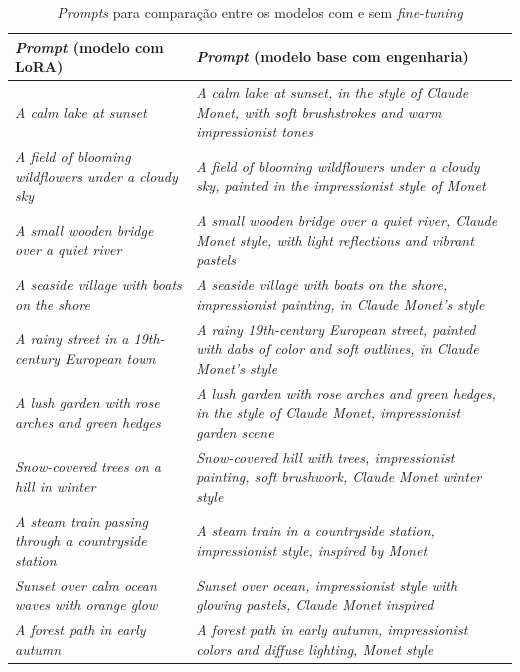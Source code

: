 \begin{table}[htb]
\caption{\textit{Prompts} para compara\c{c}\~ao entre os modelos com e sem \textit{fine-tuning}}
\centering
\begin{tabular}{p{} p{}}
\toprule
\textbf{\textit{Prompt} (modelo com LoRA)} & \textbf{\textit{Prompt} (modelo base com engenharia)} \\
\midrule
\textit{A calm lake at sunset} &
\textit{A calm lake at sunset, in the style of Claude Monet, with soft brushstrokes and warm impressionist tones} \\
\textit{A field of blooming wildflowers under a cloudy sky} &
\textit{A field of blooming wildflowers under a cloudy sky, painted in the impressionist style of Monet} \\
\textit{A small wooden bridge over a quiet river} &
\textit{A small wooden bridge over a quiet river, Claude Monet style, with light reflections and vibrant pastels }\\
\textit{A seaside village with boats on the shore }&
\textit{A seaside village with boats on the shore, impressionist painting, in Claude Monet's style }\\
\textit{A rainy street in a 19th-century European town} &
\textit{A rainy 19th-century European street, painted with dabs of color and soft outlines, in Claude Monet’s style} \\
\textit{A lush garden with rose arches and green hedges} &
\textit{A lush garden with rose arches and green hedges, in the style of Claude Monet, impressionist garden scene} \\
\textit{Snow-covered trees on a hill in winter }&
\textit{Snow-covered hill with trees, impressionist painting, soft brushwork, Claude Monet winter style} \\
\textit{A steam train passing through a countryside station} &
\textit{A steam train in a countryside station, impressionist style, inspired by Monet }\\
\textit{Sunset over calm ocean waves with orange glow }&
\textit{Sunset over ocean, impressionist style with glowing pastels, Claude Monet inspired }\\
\textit{A forest path in early autumn} &
\textit{A forest path in early autumn, impressionist colors and diffuse lighting, Monet style} \\
\bottomrule
\end{tabular}
\label{tab:prompts}
\end{table}

